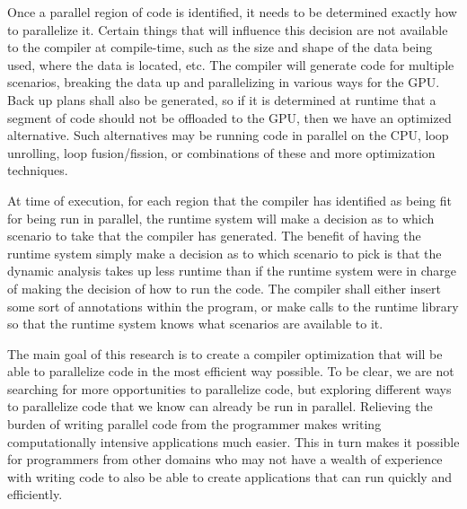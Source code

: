 \documentclass[a4paper,12pt]{article}
\begin{document}
Once a parallel region of code is identified, it needs to be determined exactly how to parallelize it.  Certain things that will influence this decision are not available to the compiler at compile-time, such as the size and shape of the data being used, where the data is located, etc.  The compiler will generate code for multiple scenarios, breaking the data up and parallelizing in various ways for the GPU.  Back up plans shall also be generated, so if it is determined at runtime that a segment of code should not be offloaded to the GPU, then we have an optimized alternative.  Such alternatives may be running code in parallel on the CPU, loop unrolling, loop fusion/fission, or combinations of these and more optimization techniques.  

At time of execution, for each region that the compiler has identified as being fit for being run in parallel, the runtime system will make a decision as to which scenario to take that the compiler has generated.  The benefit of having the runtime system simply make a decision as to which scenario to pick is that the dynamic analysis takes up less runtime than if the runtime system were in charge of making the decision of how to run the code.  The compiler shall either insert some sort of annotations within the program, or make calls to the runtime library so that the runtime system knows what scenarios are available to it.

The main goal of this research is to create a compiler optimization that will be able to parallelize code in the most efficient way possible.  To be clear, we are not searching for more opportunities to parallelize code, but exploring different ways to parallelize code that we know can already be run in parallel.  Relieving the burden of writing parallel code from the programmer makes writing computationally intensive applications much easier.  This in turn makes it possible for programmers from other domains who may not have a wealth of experience with writing code to also be able to create applications that can run quickly and efficiently.
\end{document}

